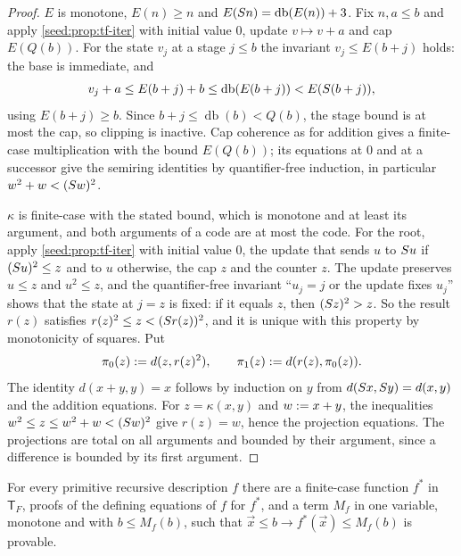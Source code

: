 \begin{proof}
$E$ is monotone, $E(n)\geq n$ and
$E(S n)=\operatorname{db}(E(n))+3$. Fix $n,a\leq b$ and apply
\cref{seed:prop:tf-iter} with initial value $0$, update $v\mapsto v+a$ and
cap $E(Q(b))$. For the state $v_j$ at a stage $j\leq b$ the invariant
$v_j\leq E(b+j)$ holds: the base is immediate, and
\[
 v_j+a\leq E(b+j)+b\leq\operatorname{db}(E(b+j))<E(S(b+j)),
\]
using $E(b+j)\geq b$. Since $b+j\leq\operatorname{db}(b)<Q(b)$, the stage
bound is at most the cap, so clipping is inactive. Cap coherence as for
addition gives a finite-case multiplication with the bound $E(Q(b))$; its
equations at $0$ and at a successor give the semiring identities by
quantifier-free induction, in particular $w^2+w<(S w)^2$.

$\kappa$ is finite-case with the stated bound, which is monotone and at
least its argument, and both arguments of a code are at most the code. For
the root, apply \cref{seed:prop:tf-iter} with initial value $0$, the update
that sends $u$ to $S u$ if $(S u)^2\leq z$ and to $u$ otherwise, the
cap $z$ and the counter $z$. The update preserves $u\leq z$ and
$u^2\leq z$, and the quantifier-free invariant ``$u_j=j$ or the update
fixes $u_j$'' shows that the state at $j=z$ is fixed: if it equals $z$,
then $(S z)^2>z$. So the result $r(z)$ satisfies
$r(z)^2\leq z<(S r(z))^2$, and it is unique with this property by
monotonicity of squares. Put
\[
 \pi_0(z)\mathrel{:=} d(z,r(z)^2),\qquad\pi_1(z)\mathrel{:=} d(r(z),\pi_0(z)).
\]
The identity $d(x+y,y)=x$ follows by induction on $y$ from
$d(S x,S y)=d(x,y)$ and the addition equations. For
$z=\kappa(x,y)$ and $w\mathrel{:=} x+y$, the inequalities
$w^2\leq z\leq w^2+w<(S w)^2$ give $r(z)=w$, hence the projection
equations. The projections are total on all arguments and bounded by their
argument, since a difference is bounded by its first argument.
\end{proof}

\begin{theorem}\label{seed:thm:tf-primrec}
For every primitive recursive description $f$ there are a finite-case
function $f^{*}$ in $\mathsf{T}_F$, proofs of the defining equations of $f$
for $f^{*}$, and a term $M_f$ in one variable, monotone and with
$b\leq M_f(b)$, such that $\vec x\leq b\to f^{*}(\vec x)\leq M_f(b)$ is
provable.
\end{theorem}

